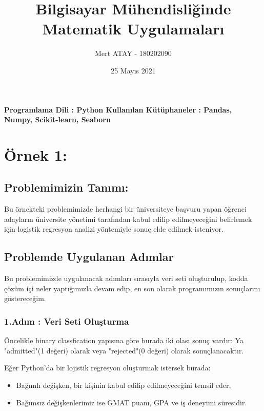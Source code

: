 \documentclass{article}
\title{Bilgisayar Mühendisliğinde Matematik Uygulamaları}
\author{Mert ATAY - 180202090}
\date{25 Mayıs 2021}
\begin{document}
\maketitle
\paragraph{
  Programlama Dili : Python
  \newline
  Kullanılan Kütüphaneler : Pandas, Numpy, Scikit-learn, Seaborn 
}
\section{Örnek 1:}
\subsection{Problemimizin Tanımı:}



\hspace{1cm}Bu örnekteki problemimizde herhangi bir üniversiteye başvuru yapan öğrenci adayların üniversite yönetimi tarafından kabul edilip edilmeyeceğini belirlemek için logistik regresyon analizi yöntemiyle sonuç elde edilmek isteniyor.


\subsection{Problemde Uygulanan Adımlar}

\hspace{1cm} Bu problemimizde uygulanacak adımları sırasıyla veri seti oluşturulup, kodda çözüm içi neler yaptığımızla devam edip, en son olarak programımızın sonuçlarını göstereceğim.



\subsubsection{1.Adım : Veri Seti Oluşturma}
\hspace{1cm}Öncelikle binary classfication yapısına göre burada iki olası sonuç vardır:
Ya "admitted"(1 değeri) olarak veya  "rejected"(0 değeri) olarak sonuçlanacaktır.
\newline

Eğer Python'da bir lojistik regresyon oluşturmak istersek burada:
\begin{itemize}
    \item Bağımlı değişken, bir kişinin kabul edilip edilmeyeceğini temsil eder,
    \item Bağımsız değişkenlerimiz ise GMAT puanı, GPA ve iş deneyimi süresidir.
\end{itemize}
\end{document}

